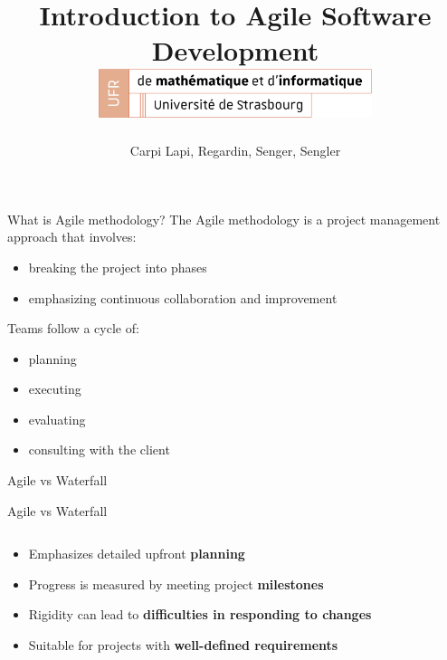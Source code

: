 \documentclass[10pt]{beamer}
\title[Introduction to Agile Software Development]{
  Introduction to Agile Software Development \\
  \vspace{1cm}
    \includegraphics[width=0.6\textwidth]{images/logo_Uni.png}}
\author[SuperAgile]{Carpi Lapi, Regardin, Senger, Sengler}
\begin{document}
\frame{\titlepage}

\begin{frame}{What is Agile methodology?}
The Agile methodology is a project management approach that involves:
\begin{itemize}
    \item<2-> breaking the project into phases
    \item<3-> emphasizing continuous collaboration and improvement \\
    \vspace{1cm}
\end{itemize}

Teams follow a cycle of: 
\begin{itemize}
    \item<4-> planning
    \item<5-> executing
    \item<6-> evaluating
    \item<7-> consulting with the client
\end{itemize}

\end{frame}

\begin{frame}{Agile vs Waterfall}
  \vspace{0.5cm}
\end{frame}

\begin{frame}{Agile vs Waterfall}
  \vspace{0.5cm}
  \begin{columns}[T]

    \begin{column}{0.5\textwidth}
      \vspace{2cm}
      \begin{itemize}
        \item<2-> Emphasizes detailed upfront \textbf{planning}
        \item<3-> Progress is measured by meeting project \textbf{milestones}
        \item<4-> Rigidity can lead to \textbf{difficulties in responding to changes}
        \item<5-> Suitable for projects with \textbf{well-defined requirements}
      \end{itemize}
    \end{column}

    \begin{column}{0.5\textwidth}
    \end{column}

  \end{columns}
\end{frame}
\end{document}
